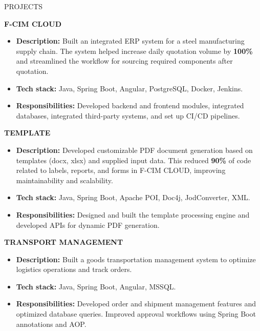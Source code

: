 \documentclass{resume}
\begin{document}
\begin{rSection}{PROJECTS}
\vspace{-1.25em}

\begin{samepage}
\item \textbf{F-CIM CLOUD}
\begin{itemize}
    \itemsep -3pt {}
    \item \textbf{Description:} Built an integrated ERP system for a steel manufacturing supply chain. The system helped increase daily quotation volume by \textbf{100\%} and streamlined the workflow for sourcing required components after quotation.
    \item \textbf{Tech stack:} Java, Spring Boot, Angular, PostgreSQL, Docker, Jenkins.
    \item \textbf{Responsibilities:} Developed backend and frontend modules, integrated databases, integrated third-party systems, and set up CI/CD pipelines.
\end{itemize}
\end{samepage}

\begin{samepage}
\item \textbf{TEMPLATE}
\begin{itemize}
    \itemsep -3pt {}
    \item \textbf{Description:} Developed customizable PDF document generation based on templates (docx, xlsx) and supplied input data. This reduced \textbf{90\%} of code related to labels, reports, and forms in F-CIM CLOUD, improving maintainability and scalability.
    \item \textbf{Tech stack:} Java, Spring Boot, Apache POI, Doc4j, JodConverter, XML.
    \item \textbf{Responsibilities:} Designed and built the template processing engine and developed APIs for dynamic PDF generation.
\end{itemize}
\end{samepage}

\begin{samepage}
\item \textbf{TRANSPORT MANAGEMENT}
\begin{itemize}
    \itemsep -3pt {}
    \item \textbf{Description:} Built a goods transportation management system to optimize logistics operations and track orders.
    \item \textbf{Tech stack:} Java, Spring Boot, Angular, MSSQL.
    \item \textbf{Responsibilities:} Developed order and shipment management features and optimized database queries. Improved approval workflows using Spring Boot annotations and AOP.
\end{itemize}
\end{samepage}


\end{rSection}
\end{document}
